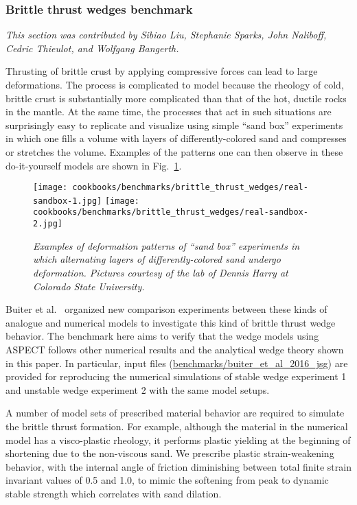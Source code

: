 \documentclass{article}
\newcommand{\aspect}{\textsc{ASPECT}}
\begin{document}
\subsubsection{Brittle thrust wedges benchmark}
\label{sec:benchmark-brittle-thrust-wedge}

\textit{This section was contributed by Sibiao Liu, Stephanie Sparks, John 
Naliboff, Cedric Thieulot, and Wolfgang Bangerth.}

Thrusting of brittle crust by applying compressive forces can lead to
large deformations. The process is complicated to model because the
rheology of cold, brittle crust is substantially more complicated than
that of the hot, ductile rocks in the mantle. At the same time, the
processes that act in such situations are surprisingly easy to
replicate and visualize using simple ``sand box'' experiments in which
one fills a volume with layers of differently-colored sand and compresses
or stretches the volume. Examples of the patterns one can then observe
in these do-it-yourself models are shown in
Fig.~\ref{fig:sandbox-images}.

\begin{figure}
  \centering
  \texttt{[image: cookbooks/benchmarks/brittle\_thrust\_wedges/real-sandbox-1.jpg]}
  \hfill
  \texttt{[image: cookbooks/benchmarks/brittle\_thrust\_wedges/real-sandbox-2.jpg]}
  \caption{\it Examples of deformation patterns of ``sand box'' experiments in
    which alternating layers of differently-colored sand undergo deformation.
    Pictures courtesy of the lab of Dennis Harry at Colorado State University.}
  \label{fig:sandbox-images}
\end{figure}

Buiter et al.~\cite{buiter16} organized new comparison experiments between these kinds of 
analogue and numerical models to investigate this kind of brittle thrust wedge behavior. The 
benchmark here aims to verify that the wedge models using \aspect{} follows other 
numerical results and the analytical wedge theory shown in this paper. In particular, 
input files (\url{benchmarks/buiter_et_al_2016_jsg}) are provided for reproducing 
the numerical simulations of stable wedge experiment 1 and unstable wedge experiment 
2 with the same model setups.

A number of model sets of prescribed material behavior are required to simulate 
the brittle thrust formation. For example, although the material in the numerical 
model has a visco-plastic rheology, it performs plastic yielding at the beginning 
of shortening due to the non-viscous sand. We prescribe plastic strain-weakening 
behavior, with the internal angle of friction diminishing between total finite 
strain invariant values of 0.5 and 1.0, to mimic the softening from peak to 
dynamic stable strength which correlates with sand dilation. 
\end{document}
